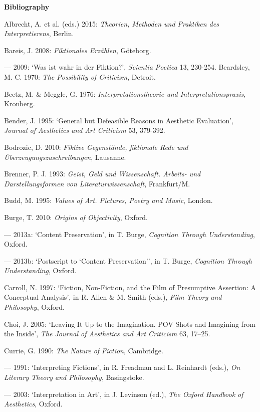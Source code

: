 \vspace{.2cm}
\noindent\textbf{\large Bibliography}
\vspace{.2cm}

\begin{hangparas}{.5cm}{1}

Albrecht, A. et al. (eds.) 2015: \emph{Theorien, Methoden und Praktiken des Interpretierens}, Berlin.

Bareis, J. 2008: \emph{Fiktionales Erz\"ahlen}, G\"oteborg.

--- 2009: `Was ist wahr in der Fiktion?', \emph{Scientia Poetica} 13, 230-254. 
Beardsley, M. C. 1970: \emph{The Possibility of Criticism}, Detroit.

Beetz, M. \& Meggle, G. 1976: \emph{Interpretationstheorie und Interpretationspraxis}, Kronberg.

Bender, J. 1995: `General but Defeasible Reasons in Aesthetic Evaluation', \emph{Journal of Aesthetics and Art Criticism} 53, 379-392. 

Bodrozic, D. 2010: \emph{Fiktive Gegenst\"ande, fiktionale Rede und \"Uberzeugungszuschreibungen}, Lausanne.

Brenner, P. J. 1993: \emph{Geist, Geld und Wissenschaft. Arbeits- und Darstellungsformen von Literaturwissenschaft}, Frankfurt/M.

Budd, M. 1995: \emph{Values of Art. Pictures, Poetry and Music}, London. 

Burge, T. 2010: \emph{Origins of Objectivity}, Oxford.

--- 2013a: `Content Preservation', in T. Burge, \emph{Cognition Through Understanding}, Oxford.

--- 2013b: `Postscript to `Content Preservation'', in T. Burge, \emph{Cognition Through Understanding}, Oxford.

Carroll, N. 1997: `Fiction, Non-Fiction, and the Film of Presumptive Assertion: A Conceptual Analysis', in R. Allen \& M. Smith (eds.), \emph{Film Theory and Philosophy}, Oxford.

Choi, J. 2005: `Leaving It Up to the Imagination. POV Shots and Imagining from the Inside', \emph{The Journal of Aesthetics and Art Criticism} 63, 17--25. 

Currie, G. 1990: \emph{The Nature of Fiction}, Cambridge. 

--- 1991: `Interpreting Fictions', in R. Freadman and L. Reinhardt (eds.), \emph{On Literary Theory and Philosophy}, Basingstoke. 

--- 2003: `Interpretation in Art', in J. Levinson (ed.), \emph{The Oxford Handbook of Aesthetics}, Oxford.


\end{hangparas}
